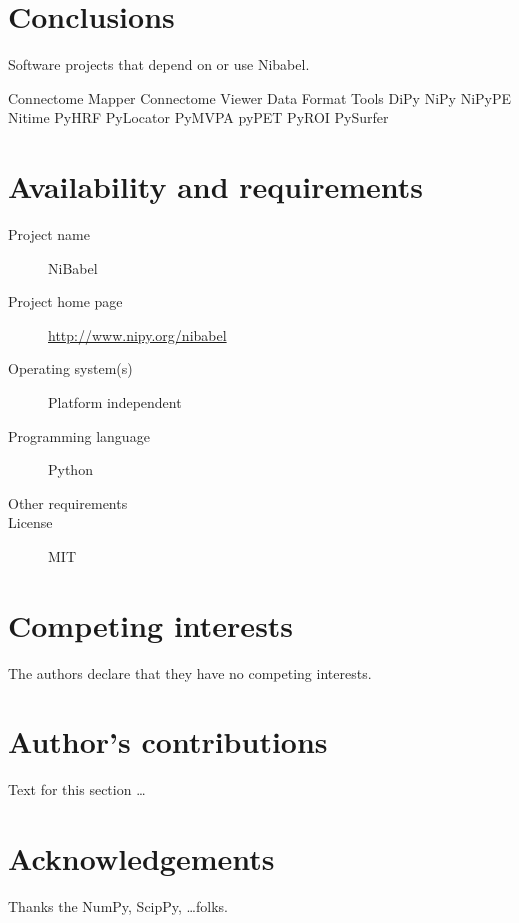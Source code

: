 \documentclass[10pt]{bmc_article}
\newenvironment{bmcformat}{\baselineskip20pt\sloppy\setboolean{publ}{false}}{\baselineskip20pt\sloppy}
\begin{document}
\begin{bmcformat}
\section{Conclusions}

Software projects that depend on or use Nibabel.

Connectome Mapper
Connectome Viewer
Data Format Tools
DiPy
NiPy
NiPyPE
Nitime
PyHRF
PyLocator
PyMVPA \cite{HHS+09b}
pyPET
PyROI
PySurfer


\section{Availability and requirements}
\begin{description}
  \item[Project name] NiBabel
  \item[Project home page] \url{http://www.nipy.org/nibabel}
  \item[Operating system(s)] Platform independent
  \item[Programming language] Python
  \item[Other requirements]
  \item[License] MIT
\end{description}

\section{Competing interests}

The authors declare that they have no competing interests.


\bigskip

\section*{Author's contributions}
    Text for this section \ldots

    

\section*{Acknowledgements}
  Thanks the NumPy, ScipPy, \ldots folks.


\end{bmcformat}
\end{document}
